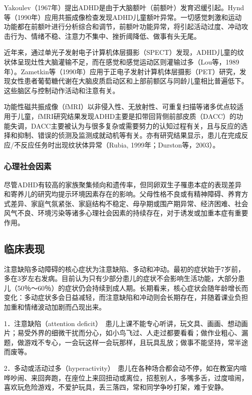 Yakoulev（1967年）提出ADHD是由于大脑额叶（前额叶）发育迟缓引起。Hynd等（1990年）应用共振成像检查发现ADHD儿童额叶异常。一切感觉刺激和运动功能都在前额叶进行分析综合和调节，前额叶功能异常，将引起活动过度、冲动攻击行为、情绪不稳、注意力不集中、挫折阈降低、做事有头无尾。

近年来，通过单光子发射电子计算机体层摄影（SPECT）发现，ADHD儿童的纹状体呈现灶性大脑灌输不足，而在感觉和感觉运动区则灌输过多（Lou等，1989年）。Zametkin等（1990年）应用于正电子发射计算机体层摄影（PET）研究，发现女性患者葡萄糖代谢在大脑皮质启动区和上部前额区与同龄儿童相比普遍低下。这些脑区与控制动作活动和注意有关。

功能性磁共振成像（fMRI）以非侵入性、无放射性、可重复扫描等诸多优点较适用于儿童，fMRI研究结果发现ADHD主要是扣带回背侧前部皮质（DACC）的功能失调，DACC主要被认为与很多复杂或需要努力的认知过程有关，且与反应的选择和抑制、错误的侦测及监测成就动机等有关。亦有研究结果显示，患儿在完成反应/不反应任务时出现纹状体异常（Rubia,
1999年；Durston等，2003）。

\subsubsection{心理社会因素}

尽管ADHD有较高的家族聚集倾向和遗传率，但同卵双生子罹患本症的表现差异和寄养儿的研究均提示环境因素存在的影响。父母性格不良或有精神障碍、养育方式差异、家庭气氛紧张、家庭结构不稳定、母孕期或围产期异常、经济困难、社会风气不良、环境污染等诸多心理社会因素的持续存在，对于诱发或加重本症有重要作用。

\subsection{临床表现}

注意缺陷多动障碍的核心症状为注意缺陷、多动和冲动。最初的症状始于7岁前，多在3岁左右发病。目前认为只有少部分患儿的症状不会影响生活功能，大部分患儿（50％～60％）的症状仍会持续到成人期。长期看来，核心症状会随年龄增长而变化：多动症状多会日益减轻，而注意缺陷和冲动则会长期存在，并随着课业负担加重和情绪波动加剧而凸现出来。

1．注意缺陷（attention
deficit）　患儿上课不能专心听讲，玩文具、画画、想动画片；易受外界的细微干扰而分心，如小鸟飞过、人走过都要看看；做作业粗心、漏题，做游戏不专心，一会玩这样一会玩那样，且玩具乱放；做事不能坚持，常半途而废等。

2．多动或活动过多（hyperactivity）　患儿在各种场合都会动不停，如在教室内喧哗吵闹、来回奔跑，在座位上来回扭动或离位，招惹别人，多嘴多舌，过度喧闹，喜欢玩危险游戏，不爱护玩具，丢三落四，常和同学争吵打架，难于安静。

